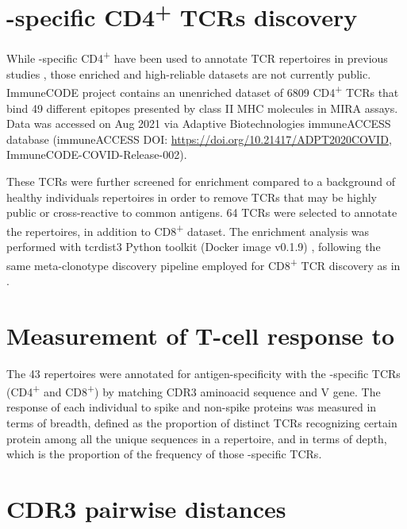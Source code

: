 \section*{\covid-specific CD4\textsuperscript{+} TCRs discovery}

While \covid-specific CD4\textsuperscript{+} have been used to annotate TCR repertoires in previous studies \citep{janssen, gittelman2021diagnosis}, those enriched and high-reliable datasets are not currently public. ImmuneCODE\texttrademark{} project contains an unenriched dataset of 6809 CD4\textsuperscript{+} TCRs that bind 49 different \covid{} epitopes presented by class II MHC molecules in MIRA assays. Data was accessed on Aug 2021 via Adaptive Biotechnologies immuneACCESS\textregistered{} database (immuneACCESS\textregistered{} DOI: \url{https://doi.org/10.21417/ADPT2020COVID}, ImmuneCODE-COVID-Release-002).

These TCRs were further screened for enrichment compared to a background of healthy individuals repertoires in order to remove TCRs that may be highly public or cross-reactive to common antigens. 64 TCRs were selected to annotate the repertoires, in addition to CD8\textsuperscript{+} dataset. The enrichment analysis was performed with tcrdist3 Python toolkit (Docker image v0.1.9) \citep{metaclonotypes, tcrdist}, following the same meta-clonotype discovery pipeline employed for \covid{} CD8\textsuperscript{+} TCR discovery as in \cite{metaclonotypes}.






\section*{Measurement of T-cell response to \covid}

The 43 \TCRB{} repertoires were annotated for antigen-specificity with the \covid-specific TCRs (CD4\textsuperscript{+} and CD8\textsuperscript{+}) by matching CDR3 aminoacid sequence and V gene. The \covid{} response  of each individual to spike and non-spike proteins was measured in terms of breadth, defined as the proportion of distinct TCRs recognizing certain protein among all the unique sequences in a repertoire, and in terms of depth, which is the proportion of the frequency of those \covid-specific TCRs.






\section*{CDR3 pairwise distances}

